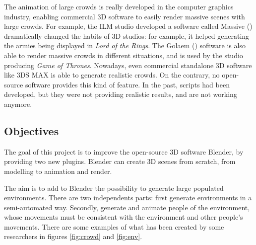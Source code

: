 \documentclass[a4paper,11pt]{article}
\begin{document}
The animation of large crowds is really developed in the computer graphics industry, enabling commercial 3D software to easily render massive scenes with large crowds. For example, the ILM studio developed a software called Massive (\cite{Massive}) dramatically changed the habits of 3D studios: for example, it helped generating the armies being displayed in \textit{Lord of the Rings}. The Golaem (\cite{Golaem}) software is also able to render massive crowds in different situations, and is used by the studio producing \textit{Game of Thrones}. Nowadays, even commercial standalone 3D software like 3DS MAX\cite{3dsmax} is able to generate realistic crowds. On the contrary, no open-source software provides this kind of feature. In the past, scripts had been developed, but they were not providing realistic results, and are not working anymore.



\subsection{Objectives}

The goal of this project is to improve the open-source 3D software Blender, by providing two new plugins. Blender can create 3D scenes from scratch, from modelling to animation and render.

The aim is to add to Blender the possibility to generate large populated environments. There are two independents parts: first generate environments in a semi-automated way. Secondly, generate and animate people of the environment, whose movements must be consistent with the environment and other people's movements. There are some examples of what has been created by some researchers in figures \ref{fig:crowd} and \ref{fig:env}.
\end{document}
